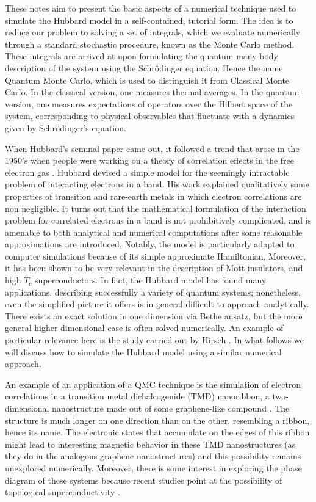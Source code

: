 \documentclass[10pt, twocolumn, twoside]{article}
\begin{document}
These notes aim to present the basic aspects of a numerical technique used to simulate the Hubbard model in a self-contained, tutorial form. The idea is to reduce our problem to solving a set of integrals, which we evaluate numerically through a standard stochastic procedure, known as the Monte Carlo method. These integrals are arrived at upon formulating the quantum many-body description of the system using the Schr\"odinger equation. Hence the name Quantum Monte Carlo, which is used to distinguish it from Classical Monte Carlo. In the classical version, one measures thermal averages. In the quantum version, one measures expectations of operators over the Hilbert space of the system, corresponding to physical observables that fluctuate with a dynamics given by Schr\"odinger's equation.

When Hubbard's seminal paper came out, it followed a trend that arose in the 1950's when people were working on a theory of correlation effects in the free electron gas \cite{Bohm1953, Gell-Mann1957, Sawada1957, Hubbard1957, Hubbard1958, Nozieres1958}. Hubbard devised a simple model for the seemingly intractable problem of interacting electrons in a band. His work explained qualitatively some properties of transition and rare-earth metals in which electron correlations are non negligible. It turns out that the mathematical formulation of the interaction problem for correlated electrons in a band is not prohibitively complicated, and is amenable to both analytical and numerical computations after some reasonable approximations are introduced. Notably, the model is particularly adapted to computer simulations because of its simple approximate Hamiltonian. Moreover, it has been shown to be very relevant in the description of Mott insulators, and high $T_c$ superconductors. In fact, the Hubbard model has found many applications, describing successfully a variety of quantum systems\cite{Editorial2013}; nonetheless, even the simplified picture it offers is in general difficult to approach analytically. There exists an exact solution in one dimension via Bethe ansatz\cite{Lieb1968}, but the more general higher dimensional case is often solved numerically. An example of particular relevance here is the study carried out by Hirsch \cite{Hirsch1985}. In what follows we will discuss how to simulate the Hubbard model using a similar numerical approach.

An example of an application of a QMC technique is the simulation of electron correlations in a transition metal dichalcogenide (TMD) nanoribbon, a two-dimensional nanostructure made out of some graphene-like compound \cite{Yang2017, Raczkowski2017, Chen2017, Wang2012, Braz2017}. The structure is much longer on one direction than on the other, resembling a ribbon, hence its name. The electronic states that accumulate on the edges of this ribbon might lead to interesting magnetic behavior in these TMD nanostructures (as they do in the analogous graphene nanostructures\cite{Yazyev2010}) and this possibility remains unexplored numerically\cite{Feldner2011, Golor2013}. Moreover, there is some interest in exploring the phase diagram of these systems because recent studies point at the possibility of topological superconductivity \cite{Hsu2017}.
\end{document}
